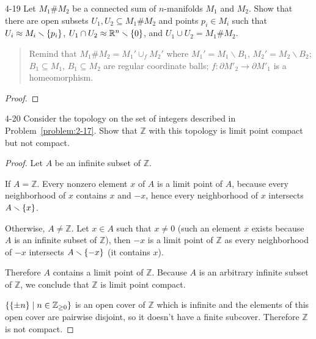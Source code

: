 \begin{problem}{4-19}
Let $M_{1} \# M_{2}$ be a connected sum of $n$-manifolds $M_{1}$ and $M_{2}$. Show that there are open subsets $U_{1}, U_{2} \subseteq M_{1} \# M_{2}$ and points $p_{i} \in M_{i}$ such that $U_{i} \approx M_{i}\smallsetminus \left\{{p_{i}}\right\}$, $U_{1} \cap U_{2} \approx \mathbb{R}^{n}\smallsetminus \left\{{0}\right\}$, and $U_{1} \cup U_{2} = M_{1} \# M_{2}$.
\end{problem}

\begin{quotation}
	Remind that $M_{1} \# M_{2} = M_{1}' \cup_{f} M_{2}'$ where $M_{1}' = M_{1}\smallsetminus B_{1}$, $M_{2}' = M_{2}\smallsetminus B_{2}$; $B_{1} \subseteq M_{1}$, $B_{1} \subseteq M_{2}$ are regular coordinate balls; $f: \partial M'_{2} \to \partial M'_{1}$ is a homeomorphism.
\end{quotation}


\begin{proof}
\end{proof}

\begin{problem}{4-20}
Consider the topology on the set of integers described in Problem~\ref{problem:2-17}. Show that $\mathbb{Z}$ with this topology is limit point compact but not compact.
\end{problem}

\begin{proof}
	Let $A$ be an infinite subset of $\mathbb{Z}$.

	If $A = \mathbb{Z}$. Every nonzero element $x$ of $A$ is a limit point of $A$, because every neighborhood of $x$ contains $x$ and $-x$, hence every neighborhood of $x$ intersects $A\smallsetminus\left\{{x}\right\}$.

	Otherwise, $A \ne \mathbb{Z}$. Let $x\in A$ such that $x\ne 0$ (such an element $x$ exists because $A$ is an infinite subset of $\mathbb{Z}$), then $-x$ is a limit point of $\mathbb{Z}$ as every neighborhood of $-x$ intersects $A\smallsetminus\left\{{-x}\right\}$ (it contains $x$).

	Therefore $A$ contains a limit point of $\mathbb{Z}$. Because $A$ is an arbitrary infinite subset of $\mathbb{Z}$, we conclude that $\mathbb{Z}$ is limit point compact.

	$\left\{{ \left\{{\pm n}\right\} \mid n\in\mathbb{Z}_{\geq 0} }\right\}$ is an open cover of $\mathbb{Z}$ which is infinite and the elements of this open cover are pairwise disjoint, so it doesn't have a finite subcover. Therefore $\mathbb{Z}$ is not compact.
\end{proof}

